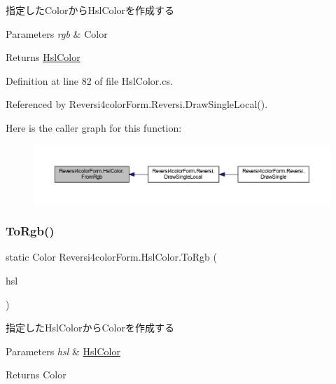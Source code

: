 指定した\+Colorから\+Hsl\+Colorを作成する 


\begin{DoxyParams}{Parameters}
{\em rgb} & Color\\
\hline
\end{DoxyParams}
\begin{DoxyReturn}{Returns}
\hyperlink{class_reversi4color_form_1_1_hsl_color}{Hsl\+Color}
\end{DoxyReturn}


Definition at line 82 of file Hsl\+Color.\+cs.



Referenced by Reversi4color\+Form.\+Reversi.\+Draw\+Single\+Local().

Here is the caller graph for this function\+:
\nopagebreak
\begin{figure}[H]
\begin{center}
\leavevmode
\includegraphics[width=350pt]{class_reversi4color_form_1_1_hsl_color_ae9adbbe822f39c29ef11839c80923718_icgraph}
\end{center}
\end{figure}
\mbox{\label{class_reversi4color_form_1_1_hsl_color_adc8d6bd6fd29eff44ccc1f2d1890fd72}} 
\subsubsection{\texorpdfstring{To\+Rgb()}{ToRgb()}}
{\footnotesize\ttfamily static Color Reversi4color\+Form.\+Hsl\+Color.\+To\+Rgb (\begin{DoxyParamCaption}\item[{\hyperlink{class_reversi4color_form_1_1_hsl_color}{Hsl\+Color}}]{hsl }\end{DoxyParamCaption})\hspace{0.3cm}{\ttfamily [static]}}



指定した\+Hsl\+Colorから\+Colorを作成する 


\begin{DoxyParams}{Parameters}
{\em hsl} & \hyperlink{class_reversi4color_form_1_1_hsl_color}{Hsl\+Color}\\
\hline
\end{DoxyParams}
\begin{DoxyReturn}{Returns}
Color
\end{DoxyReturn}


